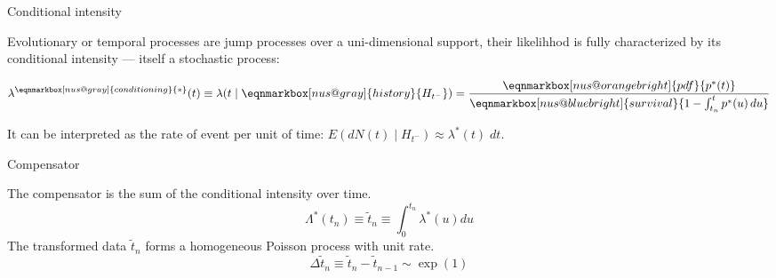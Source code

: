\documentclass[
  ignorenonframetext,
  aspectratio=169,
  xcolor={dvipsnames,rgb}
]{beamer}
\begin{document}



\begin{frame}{Conditional intensity}

Evolutionary or temporal processes are jump processes over a uni-dimensional support, their likelihhod is fully characterized by its conditional intensity --- itself a stochastic process:

\vspace{2em}

\[
  \lambda^{\eqnmarkbox[nus@gray]{conditioning}{\ast}} (t) \equiv \lambda(t \mid \eqnmarkbox[nus@gray]{history}{H_{t^-}}) = 
    \frac{
      \eqnmarkbox[nus@orangebright]{pdf}{p^\ast(t)}
    }{
      \eqnmarkbox[nus@bluebright]{survival}{1 - \int_{t_n}^{t} p^\ast(u) \, du}
    }
\]


\vspace{4em}

It can be interpreted as the rate of event per unit of time: \( E(dN(t) \mid H_{t^-}) \approx \lambda^\ast(t) \; dt \). 

\end{frame}

\begin{frame}{Compensator}

The compensator is the sum of the conditional intensity over time.
\[
  \Lambda^\ast (t_n) \equiv \tilde{t}_n \equiv \int_0^{t_n} \lambda^\ast (u) du
\]
The transformed data \( \tilde{t}_n \) forms a homogeneous Poisson process with unit rate.
\[
  \Delta \tilde{t}_n \equiv \tilde{t}_n - \tilde{t}_{n-1} \sim \exp(1)
\]

\end{frame}
\end{document}
